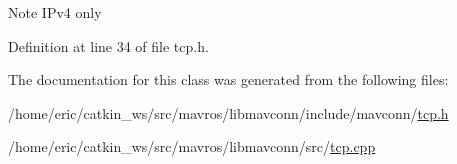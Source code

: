 \begin{DoxyNote}{Note}
I\+Pv4 only 
\end{DoxyNote}


Definition at line 34 of file tcp.\+h.



The documentation for this class was generated from the following files\+:\begin{DoxyCompactItemize}
\item 
/home/eric/catkin\+\_\+ws/src/mavros/libmavconn/include/mavconn/\mbox{\hyperlink{tcp_8h}{tcp.\+h}}\item 
/home/eric/catkin\+\_\+ws/src/mavros/libmavconn/src/\mbox{\hyperlink{tcp_8cpp}{tcp.\+cpp}}\end{DoxyCompactItemize}
